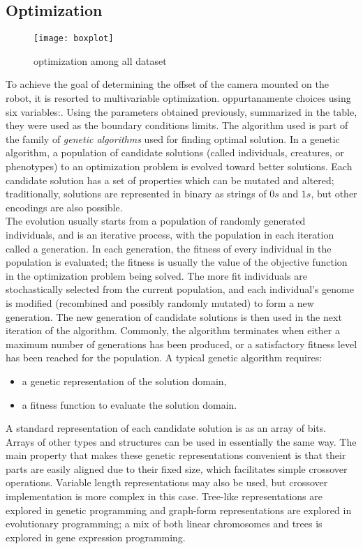\subsection{Optimization}
\begin{figure*}[htb]
\centering
\texttt{[image: boxplot]}
\caption{optimization among all dataset}
\label{fig:boxplot}
\end{figure*}
To achieve the goal of determining the offset of the camera mounted on the robot, it is resorted to multivariable optimization. oppurtanamente choices using six variables:. Using the parameters obtained previously, summarized in the table, they were used as the boundary conditions limits.
The algorithm used is part of the family of \emph{genetic algorithms} used for finding optimal solution.
In a genetic algorithm, a population of candidate solutions (called individuals, creatures, or phenotypes) to an optimization problem is evolved toward better solutions. Each candidate solution has a set of properties which can be mutated and altered; traditionally, solutions are represented in binary as strings of $0s$ and $1s$, but other encodings are also possible.\\
The evolution usually starts from a population of randomly generated individuals, and is an iterative process, with the population in each iteration called a generation. In each generation, the fitness of every individual in the population is evaluated; the fitness is usually the value of the objective function in the optimization problem being solved. The more fit individuals are stochastically selected from the current population, and each individual's genome is modified (recombined and possibly randomly mutated) to form a new generation. The new generation of candidate solutions is then used in the next iteration of the algorithm. Commonly, the algorithm terminates when either a maximum number of generations has been produced, or a satisfactory fitness level has been reached for the population.
A typical genetic algorithm requires:
\begin{itemize}
\item a genetic representation of the solution domain,
\item a fitness function to evaluate the solution domain.
\end{itemize}
A standard representation of each candidate solution is as an array of bits. Arrays of other types and structures can be used in essentially the same way. The main property that makes these genetic representations convenient is that their parts are easily aligned due to their fixed size, which facilitates simple crossover operations. Variable length representations may also be used, but crossover implementation is more complex in this case. Tree-like representations are explored in genetic programming and graph-form representations are explored in evolutionary programming; a mix of both linear chromosomes and trees is explored in gene expression programming.
